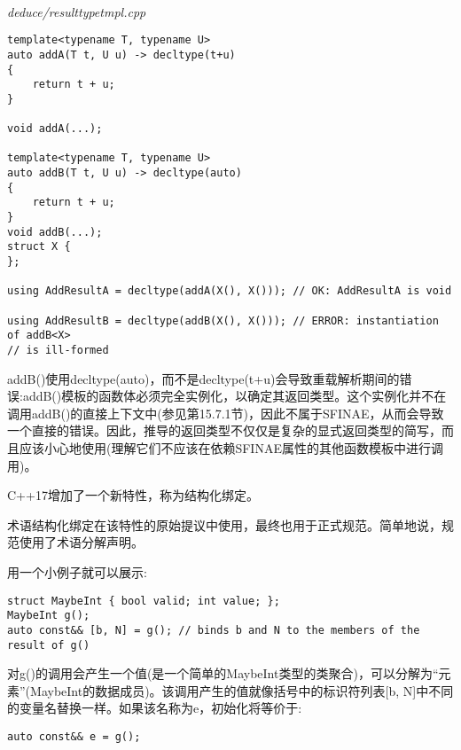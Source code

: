\hspace*{\fill} \\ %
\noindent
\textit{deduce/resulttypetmpl.cpp}
\begin{lstlisting}[style=styleCXX]
template<typename T, typename U>
auto addA(T t, U u) -> decltype(t+u)
{
	return t + u;
}

void addA(...);

template<typename T, typename U>
auto addB(T t, U u) -> decltype(auto)
{
	return t + u;
}
void addB(...);
struct X {
};

using AddResultA = decltype(addA(X(), X())); // OK: AddResultA is void

using AddResultB = decltype(addB(X(), X())); // ERROR: instantiation of addB<X>
// is ill-formed
\end{lstlisting}

addB()使用decltype(auto)，而不是decltype(t+u)会导致重载解析期间的错误:addB()模板的函数体必须完全实例化，以确定其返回类型。这个实例化并不在调用addB()的直接上下文中(参见第15.7.1节)，因此不属于SFINAE，从而会导致一个直接的错误。因此，推导的返回类型不仅仅是复杂的显式返回类型的简写，而且应该小心地使用(理解它们不应该在依赖SFINAE属性的其他函数模板中进行调用)。


C++17增加了一个新特性，称为结构化绑定。

\begin{tcolorbox}[colback=webgreen!5!white,colframe=webgreen!75!black]
\hspace*{0.75cm}术语结构化绑定在该特性的原始提议中使用，最终也用于正式规范。简单地说，规范使用了术语分解声明。
\end{tcolorbox}

用一个小例子就可以展示:

\begin{lstlisting}[style=styleCXX]
struct MaybeInt { bool valid; int value; };
MaybeInt g();
auto const&& [b, N] = g(); // binds b and N to the members of the result of g()
\end{lstlisting}

对g()的调用会产生一个值(是一个简单的MaybeInt类型的类聚合)，可以分解为“元素”(MaybeInt的数据成员)。该调用产生的值就像括号中的标识符列表[b, N]中不同的变量名替换一样。如果该名称为e，初始化将等价于:

\begin{lstlisting}[style=styleCXX]
auto const&& e = g();
\end{lstlisting}

